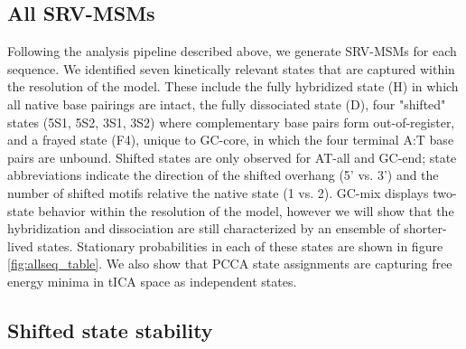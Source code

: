 \documentclass[journal=jpcbfk,manuscript=article]{achemso}
\begin{document}
\subsection{All SRV-MSMs}

Following the analysis pipeline described above, we generate SRV-MSMs for each sequence. We identified seven kinetically relevant states that are captured within the resolution of the model. These include the fully hybridized state (H) in which all native base pairings are intact, the fully dissociated state (D), four "shifted" states (5S1, 5S2, 3S1, 3S2) where complementary base pairs form out-of-register, and a frayed state (F4), unique to GC-core, in which the four terminal A:T base pairs are unbound. Shifted states are only observed for AT-all and GC-end; state abbreviations indicate the direction of the shifted overhang (5' vs. 3') and the number of shifted motifs relative the native state (1 vs. 2). GC-mix displays two-state behavior within the resolution of the model, however we will show that the hybridization and dissociation are still characterized by an ensemble of shorter-lived states. Stationary probabilities in each of these states are shown in figure \ref{fig:allseq_table}. We also show that PCCA state assignments are capturing free energy minima in tICA space as independent states.

\subsection{Shifted state stability}
\end{document}
